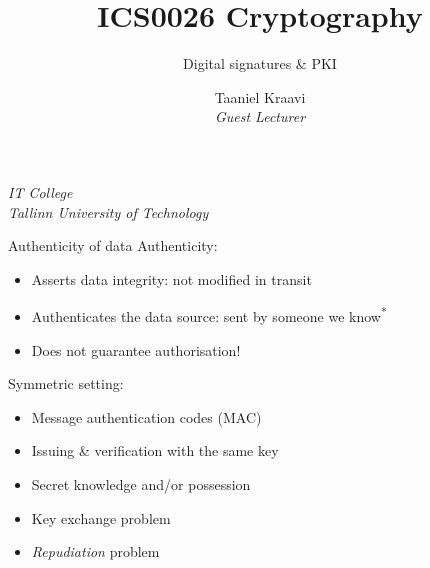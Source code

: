 

\usepackage[dvipsnames]{xcolor}

\usepackage{booktabs}

\usepackage{fancyvrb}

\usepackage{csquotes}

\usepackage{graphicx}
\graphicspath{ {../../images/} }

\usepackage{pgfplots}
\usetikzlibrary{positioning,calc,external}

\usepackage{crysymb}

\renewcommand*{\arraystretch}{1.2}

\usepackage{soul}
\usepackage[en-GB]{datetime2}

\usetikzlibrary{positioning,calc}
\graphicspath{ {../../images/} }

\title{ICS0026 Cryptography}
\subtitle{Digital signatures \& PKI}
\date{}
\author%
{%
    {Taaniel Kraavi}\\
    \textit{\footnotesize Guest Lecturer}
}
\institute%
{%
    \textit{IT College}\\
    \textit{Tallinn University of Technology}
}


\begin{frame}
  \titlepage
\end{frame}

\begin{frame}{Authenticity of data}
  Authenticity:
  \begin{itemize}[<+(1)->]
    \item Asserts data integrity: not modified in transit
    \item Authenticates the data source: sent by someone we know\textsuperscript{*}
    \item Does not guarantee authorisation!
  \end{itemize}

  \pause
  Symmetric setting:
  \begin{itemize}[<+(1)->]
    \item Message authentication codes (MAC)
    \item Issuing \& verification with the same key
    \item Secret knowledge and/or possession
    \item Key exchange problem
    \item \emph{Repudiation} problem
  \end{itemize}
\end{frame}


